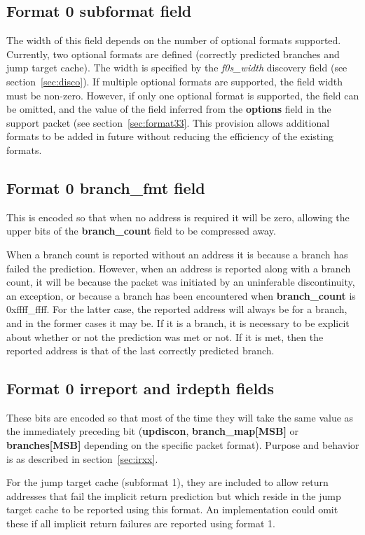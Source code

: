 \subsection{Format 0 subformat field} \label{sec:f0s}

The width of this field depends on the number of optional formats supported.  Currently, two optional formats are
defined (correctly predicted branches and jump target cache).  The width is specified by the 
\textit{f0s\_width} discovery field (see section~\ref{sec:disco}).  If multiple optional formats are supported, the field
width must be non-zero.  However, if only one optional format is supported, the field can be 
omitted, and the value of the field inferred from the \textbf{options} field in the support packet (see section~\ref{sec:format33}.  
This provision allows additional formats to be added in future without reducing the efficiency of the existing formats.

\subsection{Format 0 \textbf{branch\_fmt} field}

This is encoded so that when no address is required it will be zero, allowing the upper bits of the \textbf{branch\_count} 
field to be compressed away.

When a branch count is reported without an address it is because a branch has failed the prediction.  However, when an address is 
reported along with a branch count, it will be because the packet was initiated by an uninferable discontinuity, an exception, or 
because a branch has been encountered when \textbf{branch\_count} is 0xffff\_ffff.  For the latter case, the 
reported address will always be for a branch, and in the former cases it may be.  If it is a branch, 
it is necessary to be explicit about whether or not the prediction was met or not.  If it is met, then the reported address is 
that of the last correctly predicted branch.

\subsection{Format 0 \textbf{irreport} and \textbf{irdepth} fields}
These bits are encoded so that most of the time they will take the same value as the immediately preceding bit
(\textbf{updiscon}, \textbf{branch\_map[MSB]} or \textbf{branches[MSB]} depending on the specific packet format).  
Purpose and behavior is as described in section~\ref{sec:irxx}.

For the jump target cache (subformat 1), they are included to allow return addresses that fail the implicit return 
prediction but which reside in the jump target cache to be reported using this format.  An implementation
could omit these if all implicit return failures are reported using format 1.





